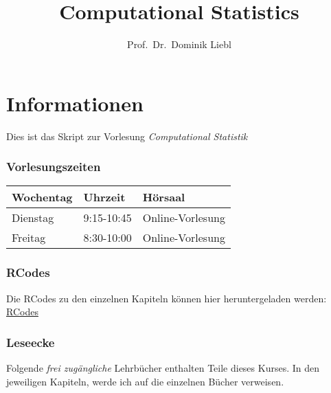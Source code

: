 \documentclass[
  ngerman,
]{book}
\title{Computational Statistics}
\author{Prof.~Dr.~Dominik Liebl}
\date{}
\begin{document}
\maketitle

{
\setcounter{tocdepth}{1}
\tableofcontents
}
\hypertarget{informationen}{%
\chapter*{Informationen}\label{informationen}}

Dies ist das Skript zur Vorlesung \emph{Computational Statistik}

\hypertarget{vorlesungszeiten}{%
\subsection*{Vorlesungszeiten}\label{vorlesungszeiten}}

\begin{table}
\centering
\begin{tabular}[t]{l|l|l}
\hline
Wochentag & Uhrzeit & Hörsaal\\
\hline
Dienstag & 9:15-10:45 & Online-Vorlesung\\
\hline
Freitag & 8:30-10:00 & Online-Vorlesung\\
\hline
\end{tabular}
\end{table}

\hypertarget{rcodes}{%
\subsection*{RCodes}\label{rcodes}}

Die RCodes zu den einzelnen Kapiteln können hier heruntergeladen werden: \href{https://github.com/lidom/Computational_Statistics_Script/tree/main/RCodes}{RCodes}

\hypertarget{leseecke}{%
\subsection*{Leseecke}\label{leseecke}}

Folgende \emph{frei zugängliche} Lehrbücher enthalten Teile dieses Kurses. In den jeweiligen Kapiteln, werde ich auf die einzelnen Bücher verweisen.
\end{document}

